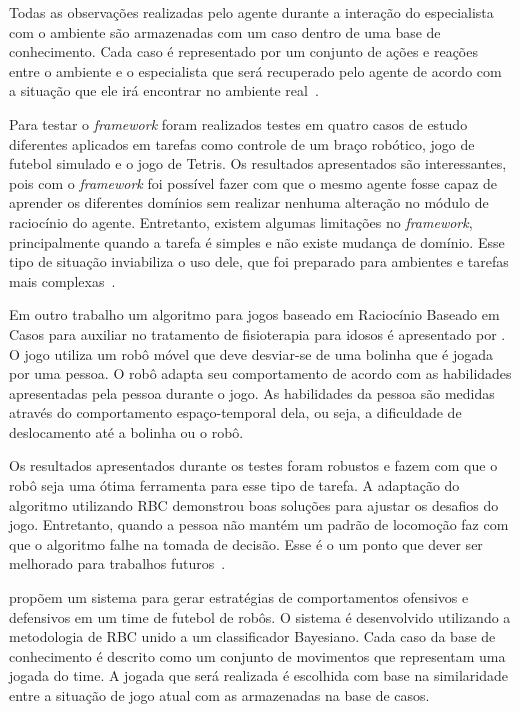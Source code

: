 Todas as observações realizadas pelo agente durante a interação do especialista com o ambiente são armazenadas com um caso dentro de uma base de conhecimento. Cada caso é representado por um conjunto de ações e reações entre o ambiente e o especialista que será recuperado pelo agente de acordo com a situação que ele irá encontrar no ambiente real~\cite{Floyd:2011}.

Para testar o \emph{framework} foram realizados testes em quatro casos de estudo diferentes aplicados em tarefas como controle de um braço robótico, jogo de futebol simulado e o jogo de Tetris. Os resultados apresentados são interessantes, pois com o \emph{framework} foi possível fazer com que o mesmo agente fosse capaz de aprender os diferentes domínios sem realizar nenhuma alteração no módulo de raciocínio do agente. Entretanto, existem algumas limitações no \emph{framework}, principalmente quando a tarefa é simples e não existe mudança de domínio. Esse tipo de situação inviabiliza o uso dele, que foi preparado para ambientes e tarefas mais complexas~\cite{Floyd:2011}.

Em outro trabalho um algoritmo para jogos baseado em Raciocínio Baseado em Casos para auxiliar no tratamento de fisioterapia para idosos é apresentado por . O jogo utiliza um robô móvel que deve desviar-se de uma bolinha que é jogada por uma pessoa. O robô adapta seu comportamento de acordo com as habilidades apresentadas pela pessoa durante o jogo. As habilidades da pessoa são medidas através do comportamento espaço-temporal dela, ou seja, a dificuldade de deslocamento até a bolinha ou o robô.

Os resultados apresentados durante os testes foram robustos e fazem com que o robô seja uma ótima ferramenta para esse tipo de tarefa. A adaptação do algoritmo utilizando RBC demonstrou boas soluções para ajustar os desafios do jogo. Entretanto, quando a pessoa não mantém um padrão de locomoção faz com que o algoritmo falhe na tomada de decisão. Esse é o um ponto que dever ser melhorado para trabalhos futuros~\cite{Hansen:2012}.

 propõem um sistema para gerar estratégias de comportamentos ofensivos e defensivos em um time de futebol de robôs. O sistema é desenvolvido utilizando a metodologia de RBC unido a um classificador Bayesiano. Cada caso da base de conhecimento é descrito como um conjunto de movimentos que representam uma jogada do time. A jogada que será realizada é escolhida com base na similaridade entre a situação de jogo atual com as armazenadas na base de casos.

